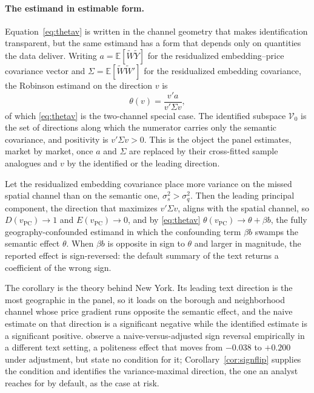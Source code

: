 \paragraph{The estimand in estimable form.} Equation~\eqref{eq:thetav} is written in
the channel geometry that makes identification transparent, but the same estimand has
a form that depends only on quantities the data deliver. Writing $a=\mathbb{E}[\tilde
W\tilde Y]$ for the residualized embedding--price covariance vector and
$\Sigma=\mathbb{E}[\tilde W\tilde W']$ for the residualized embedding covariance, the
Robinson estimand on the direction $v$ is
\begin{equation}
\theta(v)=\frac{v'a}{v'\Sigma v},
\label{eq:thetav-estimable}
\end{equation}
of which \eqref{eq:thetav} is the two-channel special case. The identified subspace
$\mathcal{V}_0$ is the set of directions along which the numerator carries only the
semantic covariance, and positivity is $v'\Sigma v>0$. This is the object the panel
estimates, market by market, once $a$ and $\Sigma$ are replaced by their cross-fitted
sample analogues and $v$ by the identified or the leading direction.

\begin{corollary}
\label{cor:signflip}
Let the residualized embedding covariance place more variance on the missed spatial
channel than on the semantic one, $\sigma_s^2>\sigma_q^2$. Then the leading principal
component, the direction that maximizes $v'\Sigma v$, aligns with the spatial channel,
so $D(v_{\mathrm{PC}})\to1$ and $E(v_{\mathrm{PC}})\to0$, and by \eqref{eq:thetav}
$\theta(v_{\mathrm{PC}})\to\theta+\beta b$, the fully geography-confounded estimand in
which the confounding term $\beta b$ swamps the semantic effect $\theta$. When
$\beta b$ is opposite in sign to $\theta$ and larger in magnitude, the reported effect
is sign-reversed: the default summary of the text returns a coefficient of the wrong
sign.
\end{corollary}

The corollary is the theory behind New York. Its leading text direction is the most
geographic in the panel, so it loads on the borough and neighborhood channel whose
price gradient runs opposite the semantic effect, and the naive estimate on that
direction is a significant negative while the identified estimate is a significant
positive. \citet{guiveitch2023} observe a naive-versus-adjusted sign reversal
empirically in a different text setting, a politeness effect that moves from $-0.038$
to $+0.200$ under adjustment, but state no condition for it; Corollary~\ref{cor:signflip}
supplies the condition and identifies the variance-maximal direction, the one an
analyst reaches for by default, as the case at risk.

